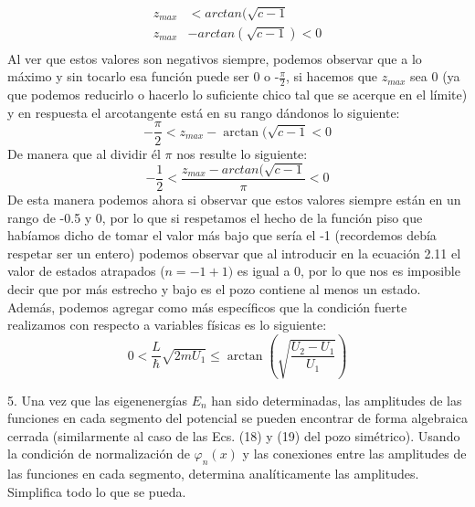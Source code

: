 \begin{align*}
    z_{max} &< arctan(\sqrt{c-1}\\
    z_{max} &- arctan(\sqrt{c-1})<0\\
\end{align*}
Al ver que estos valores son negativos siempre, podemos observar que a lo máximo y sin tocarlo esa función puede ser 0 o -$\frac{\pi}{2}$, si hacemos que $z_{max}$ sea 0 (ya que podemos reducirlo o hacerlo lo suficiente chico tal que se acerque en el límite) y en respuesta el arcotangente está en su rango dándonos lo siguiente:
\begin{equation*}
    -\frac{\pi}{2} <z_{max} - \arctan(\sqrt{c-1}<0
\end{equation*}
De manera que al dividir él $\pi$ nos resulte lo siguiente:
\begin{equation*}
    -\frac{1}{2} <\frac{z_{max} - arctan(\sqrt{c-1}}{\pi}<0
\end{equation*}
De esta manera podemos ahora si observar que estos valores siempre están en un rango de -0.5 y 0, por lo que si respetamos el hecho de la función piso que habíamos dicho de tomar el valor más bajo que sería el -1 (recordemos debía respetar ser un entero) podemos observar que al introducir en la ecuación 2.11 el valor de estados atrapados ($n = -1+1)$ es igual a 0, por lo que nos es imposible decir que por más estrecho y bajo es el pozo contiene al menos un estado.\\
Además, podemos agregar como más específicos que la condición fuerte realizamos con respecto a variables físicas es lo siguiente:
\begin{equation}
    0< \frac{L}{\hbar}\sqrt{2mU_1}\leq \arctan(\sqrt{\frac{U_2-U_1}{U_1}})
\end{equation}
\begin{pregunta}{5.}
Una vez que las eigenenergías $E_n$ han sido determinadas, las amplitudes de las funciones en cada segmento del potencial se pueden encontrar de forma algebraica cerrada (similarmente al caso de las Ecs. (18) y (19) del pozo simétrico). Usando la condición de normalización de $\varphi_n(x)$ y las conexiones entre las amplitudes de las funciones en cada segmento, determina analíticamente las amplitudes. Simplifica todo lo que se pueda.
\end{pregunta}

